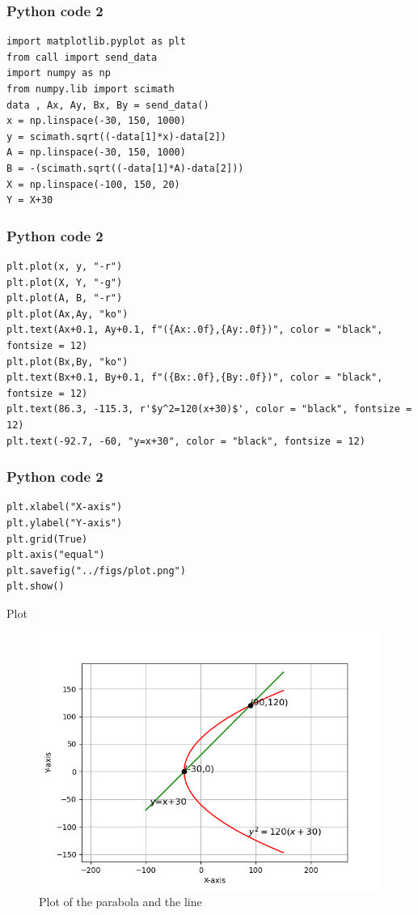 \documentclass{beamer}
\begin{document}
\begin{frame}[fragile]
    \frametitle{Python code 2}
    \begin{lstlisting}
import matplotlib.pyplot as plt
from call import send_data
import numpy as np
from numpy.lib import scimath
data , Ax, Ay, Bx, By = send_data()
x = np.linspace(-30, 150, 1000)
y = scimath.sqrt((-data[1]*x)-data[2])
A = np.linspace(-30, 150, 1000)
B = -(scimath.sqrt((-data[1]*A)-data[2]))
X = np.linspace(-100, 150, 20)
Y = X+30
    \end{lstlisting}
\end{frame}

\begin{frame}[fragile]
    \frametitle{Python code 2}
    \begin{lstlisting}
plt.plot(x, y, "-r")
plt.plot(X, Y, "-g")
plt.plot(A, B, "-r")
plt.plot(Ax,Ay, "ko")
plt.text(Ax+0.1, Ay+0.1, f"({Ax:.0f},{Ay:.0f})", color = "black", fontsize = 12)
plt.plot(Bx,By, "ko")
plt.text(Bx+0.1, By+0.1, f"({Bx:.0f},{By:.0f})", color = "black", fontsize = 12)
plt.text(86.3, -115.3, r'$y^2=120(x+30)$', color = "black", fontsize = 12)
plt.text(-92.7, -60, "y=x+30", color = "black", fontsize = 12)
    \end{lstlisting}
\end{frame}

\begin{frame}[fragile]
    \frametitle{Python code 2}
    \begin{lstlisting}
plt.xlabel("X-axis")
plt.ylabel("Y-axis")
plt.grid(True)
plt.axis("equal")
plt.savefig("../figs/plot.png")
plt.show()
    \end{lstlisting}
\end{frame}

\begin{frame}{Plot}
    \begin{figure}
        \centering
        \includegraphics[width=0.5\columnwidth]{../figs/plot.png}
        \caption{Plot of the parabola and the line}
        \label{fig:fig}
    \end{figure}
\end{frame}
\end{document}
